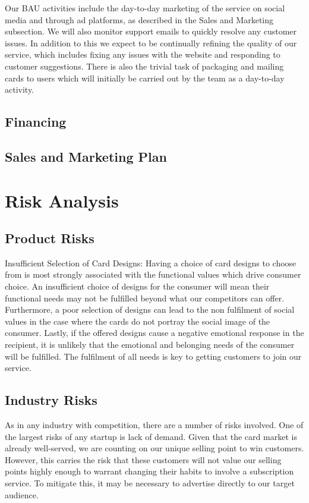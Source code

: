 \documentclass[10pt,a4paper]{article}
\begin{document}
Our BAU activities include the day-to-day marketing of the service on social media and through ad platforms, as described in the Sales and Marketing subsection. We will also monitor support emails to quickly resolve any customer issues. In addition to this we expect to be continually refining the quality of our service, which includes fixing any issues with the website and responding to customer suggestions. There is also the trivial task of packaging and mailing cards to users which will initially be carried out by the team as a day-to-day activity.

\subsection*{Financing}

\subsection*{Sales and Marketing Plan}

\section*{Risk Analysis}
\subsection*{Product Risks}
Insufficient Selection of Card Designs: Having a choice of card designs to choose from is most strongly associated with the functional values which drive consumer choice. An insufficient choice of designs for the consumer will mean their functional needs may not be fulfilled beyond what our competitors can offer. Furthermore, a poor selection of designs can lead to the non fulfilment of social values in the case where the cards do not portray the social image of the consumer. Lastly, if the offered designs cause a negative emotional response in the recipient, it is unlikely that the emotional and belonging needs of the consumer will be fulfilled. The fulfilment of all needs is key to getting customers to join our service.

\subsection*{Industry Risks}
As in any industry with competition, there are a number of risks involved. One of the largest risks of any startup is lack of demand. Given that the card market is already well-served, we are counting on our unique selling point to win customers. However, this carries the risk that these customers will not value our selling points highly enough to warrant changing their habits to involve a subscription service. To mitigate this, it may be necessary to advertise directly to our target audience.
\end{document}
